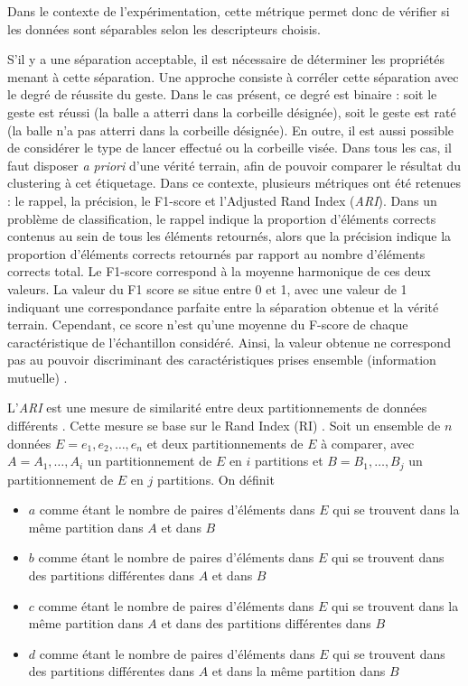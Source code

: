 Dans le contexte de l'expérimentation, cette métrique permet donc de vérifier si les données sont séparables selon les descripteurs choisis.

S'il y a une séparation acceptable, il est nécessaire de déterminer les propriétés menant à cette séparation. Une approche consiste à corréler cette séparation avec le degré de réussite du geste. Dans le cas présent, ce degré est binaire : soit le geste est réussi (la balle a atterri dans la corbeille désignée), soit le geste est raté (la balle n'a pas atterri dans la corbeille désignée). En outre, il est aussi possible de considérer le type de lancer effectué ou la corbeille visée. Dans tous les cas, il faut disposer \textit{a priori} d'une vérité terrain, afin de pouvoir comparer le résultat du clustering à cet étiquetage. Dans ce contexte, plusieurs métriques ont été retenues : le rappel, la précision, le F1-score et l'Adjusted Rand Index (\textit{ARI}). Dans un problème de classification, le rappel indique la proportion d'éléments corrects contenus au sein de tous les éléments retournés, alors que la précision indique la proportion d'éléments corrects retournés par rapport au nombre d'éléments corrects total. Le F1-score correspond à la moyenne harmonique de ces deux valeurs. La valeur du F1 score se situe entre 0 et 1, avec une valeur de 1 indiquant une correspondance parfaite entre la séparation obtenue et la vérité terrain. Cependant, ce score n'est qu'une moyenne du F-score de chaque caractéristique de l'échantillon considéré. Ainsi, la valeur obtenue ne correspond pas au pouvoir discriminant des caractéristiques prises ensemble (information mutuelle) \parencite{Chen2006CSw}. %

L'\textit{ARI} est une mesure de similarité entre deux partitionnements de données différents \parencite{Morey1984ARI}. Cette mesure se base sur le Rand Index (RI) \parencite{Rand2971RI}. Soit un ensemble de $n$ données $E = {e_1, e_2, \ldots, e_n}$ et deux partitionnements de $E$ à comparer, avec $A = {A_1, \ldots, A_i}$ un partitionnement de $E$ en $i$ partitions et $B = {B_1, \ldots, B_j}$ un partitionnement de $E$ en $j$ partitions. On définit
\begin{itemize}
	\item $a$ comme étant le nombre de paires d'éléments dans $E$ qui se trouvent dans la même partition dans $A$ et dans $B$
	\item $b$ comme étant le nombre de paires d'éléments dans $E$ qui se trouvent dans des partitions différentes dans $A$ et dans $B$
	\item $c$ comme étant le nombre de paires d'éléments dans $E$ qui se trouvent dans la même partition dans $A$ et dans des partitions différentes dans $B$
	\item $d$ comme étant le nombre de paires d'éléments dans $E$ qui se trouvent dans des partitions différentes dans $A$ et dans la même partition dans $B$
\end{itemize}


